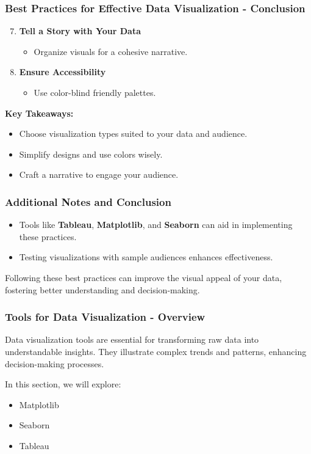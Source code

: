 \documentclass[aspectratio=169]{beamer}
\begin{document}
\begin{frame}[fragile]
    \frametitle{Best Practices for Effective Data Visualization - Conclusion}
    \begin{enumerate}
        \setcounter{enumi}{6}
        \item \textbf{Tell a Story with Your Data}
        \begin{itemize}
            \item Organize visuals for a cohesive narrative.
        \end{itemize}

        \item \textbf{Ensure Accessibility}
        \begin{itemize}
            \item Use color-blind friendly palettes.
        \end{itemize}
    \end{enumerate}

    \textbf{Key Takeaways:}
    \begin{itemize}
        \item Choose visualization types suited to your data and audience.
        \item Simplify designs and use colors wisely.
        \item Craft a narrative to engage your audience.
    \end{itemize}
\end{frame}

\begin{frame}[fragile]
    \frametitle{Additional Notes and Conclusion}
    \begin{itemize}
        \item Tools like \textbf{Tableau}, \textbf{Matplotlib}, and \textbf{Seaborn} can aid in implementing these practices.
        \item Testing visualizations with sample audiences enhances effectiveness.
    \end{itemize}

    Following these best practices can improve the visual appeal of your data, fostering better understanding and decision-making.
\end{frame}

\begin{frame}[fragile]
    \frametitle{Tools for Data Visualization - Overview}
    Data visualization tools are essential for transforming raw data into understandable insights. They illustrate complex trends and patterns, enhancing decision-making processes.
    
    In this section, we will explore:
    \begin{itemize}
        \item Matplotlib
        \item Seaborn
        \item Tableau
    \end{itemize}
\end{frame}
\end{document}
